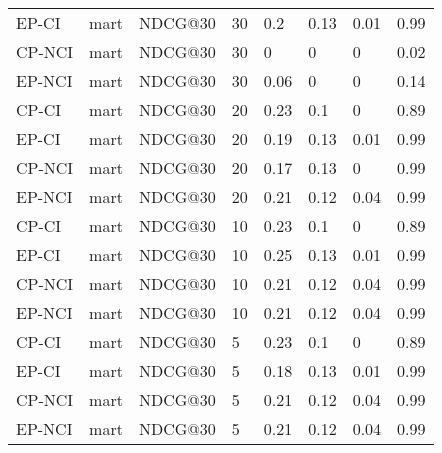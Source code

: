 \begin{landscape}
\begin{longtable}{|*{8}{l|}}
EP-CI&mart&NDCG@30&30&0.2&0.13&0.01&0.99\\
CP-NCI&mart&NDCG@30&30&0&0&0&0.02\\
EP-NCI&mart&NDCG@30&30&0.06&0&0&0.14\\
\hline
CP-CI&mart&NDCG@30&20&0.23&0.1&0&0.89\\
EP-CI&mart&NDCG@30&20&0.19&0.13&0.01&0.99\\
CP-NCI&mart&NDCG@30&20&0.17&0.13&0&0.99\\
EP-NCI&mart&NDCG@30&20&0.21&0.12&0.04&0.99\\
\hline
CP-CI&mart&NDCG@30&10&0.23&0.1&0&0.89\\
EP-CI&mart&NDCG@30&10&0.25&0.13&0.01&0.99\\
CP-NCI&mart&NDCG@30&10&0.21&0.12&0.04&0.99\\
EP-NCI&mart&NDCG@30&10&0.21&0.12&0.04&0.99\\
\hline
CP-CI&mart&NDCG@30&5&0.23&0.1&0&0.89\\
EP-CI&mart&NDCG@30&5&0.18&0.13&0.01&0.99\\
CP-NCI&mart&NDCG@30&5&0.21&0.12&0.04&0.99\\
EP-NCI&mart&NDCG@30&5&0.21&0.12&0.04&0.99\\
\hline
\hline
\end{longtable}
\end{landscape}
